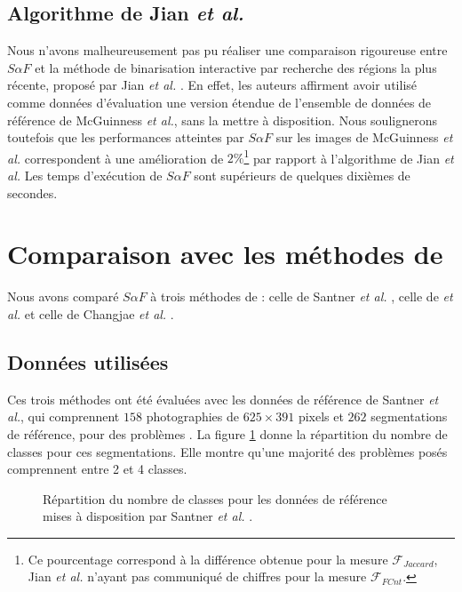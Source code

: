 \subsection{Algorithme de Jian \textit{et al.}}
Nous n'avons malheureusement pas pu réaliser une comparaison rigoureuse entre $S \alpha F$ et la méthode de binarisation interactive par recherche des régions la plus récente, proposé par Jian \textit{et al.} \cite{jian2016interactive}. En effet, les auteurs affirment avoir utilisé comme données d'évaluation une version étendue de l'ensemble de données de référence de McGuinness \textit{et al.}, sans la mettre à disposition. Nous soulignerons toutefois que
les performances atteintes par $S \alpha F$ sur les images de McGuinness \textit{et al.} correspondent à une amélioration de $2 \%$\footnote{Ce pourcentage correspond à la différence obtenue pour la mesure $\mathcal{F}_{Jaccard}$, Jian \textit{et al.} n'ayant pas communiqué de chiffres pour la mesure $\mathcal{F}_{FCnt}$.} par rapport à l'algorithme de Jian \textit{et al.} Les temps d'exécution de $S \alpha F$ sont supérieurs de quelques dixièmes de secondes.


\section{Comparaison avec les méthodes de }

Nous avons comparé $S \alpha F$ à trois méthodes de  : celle de Santner \textit{et al.} \cite{santner2010interactive}, celle de  \textit{et al.} \cite{muller2016robust}  et celle de Changjae \textit{et al.} \cite{Changjae2017Robust}. 
\subsection{Données utilisées}

Ces trois méthodes ont été évaluées avec les données de référence de Santner \textit{et al.}, qui comprennent $158$ photographies de $625 \times 391$ pixels et $262$ segmentations de référence, pour des problèmes .  La figure \ref{fig:eval:stnerClasses} donne la répartition du nombre de classes pour ces segmentations. Elle montre qu'une majorité des problèmes posés comprennent entre 2 et 4 classes. 

\begin{figure}[htb]
\begin{center}
\scalebox{.4}{

}
\caption{Répartition du nombre de classes pour les données de référence mises à disposition par Santner \textit{et al.} \cite{santner2010interactive}.}
\label{fig:eval:stnerClasses}
\end{center}
\end{figure}

